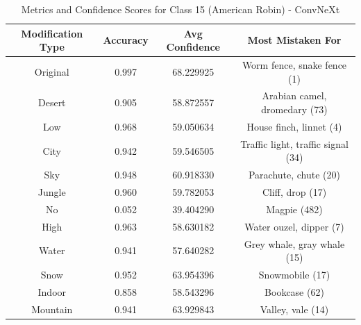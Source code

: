 \begin{table}
	\centering
	\begin{tabular}{|c|c|c|c|}
		\hline
		\textbf{Modification Type} & \textbf{Accuracy} & \textbf{Avg Confidence} & \textbf{Most Mistaken For} \\
		\hline
		Original & 0.997 & 68.229925 & Worm fence, snake fence (1) \\
		\hline
		Desert & 0.905 & 58.872557 & Arabian camel, dromedary (73) \\
		\hline
		Low & 0.968 & 59.050634 & House finch, linnet (4) \\
		\hline
		City & 0.942 & 59.546505 & Traffic light, traffic signal (34) \\
		\hline
		Sky & 0.948 & 60.918330 & Parachute, chute (20) \\
		\hline
		Jungle & 0.960 & 59.782053 & Cliff, drop (17) \\
		\hline
		No & 0.052 & 39.404290 & Magpie (482) \\
		\hline
		High & 0.963 & 58.630182 & Water ouzel, dipper (7) \\
		\hline
		Water & 0.941 & 57.640282 & Grey whale, gray whale (15) \\
		\hline
		Snow & 0.952 & 63.954396 & Snowmobile (17) \\
		\hline
		Indoor & 0.858 & 58.543296 & Bookcase (62) \\
		\hline
		Mountain & 0.941 & 63.929843 & Valley, vale (14) \\
		\hline
	\end{tabular}
	\caption{Metrics and Confidence Scores for Class 15 (American Robin) - ConvNeXt}
	\label{tab:metrics_confidence_class_15_convnext}
\end{table}
